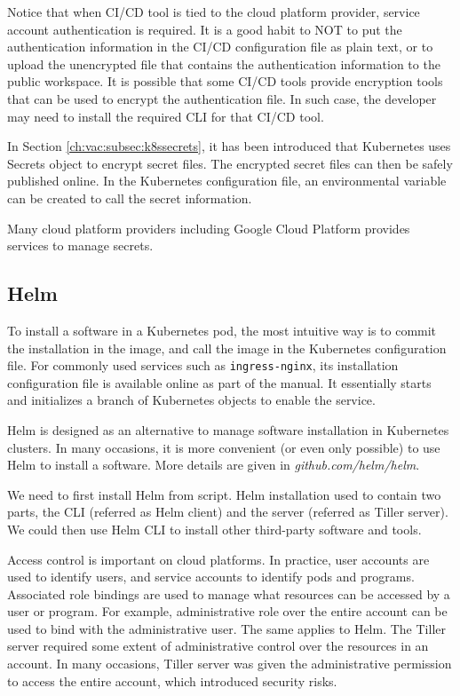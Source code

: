 Notice that when CI/CD tool is tied to the cloud platform provider, service account authentication is required. It is a good habit to NOT to put the authentication information in the CI/CD configuration file as plain text, or to upload the unencrypted file that contains the authentication information to the public workspace. It is possible that some CI/CD tools provide encryption tools that can be used to encrypt the authentication file. In such case, the developer may need to install the required CLI for that CI/CD tool.

In Section \ref{ch:vac:subsec:k8ssecrets}, it has been introduced that Kubernetes uses Secrets object to encrypt secret files. The encrypted secret files can then be safely published online. In the Kubernetes configuration file, an environmental variable can be created to call the secret information.

Many cloud platform providers including Google Cloud Platform provides services to manage secrets.

\subsection{Helm}

To install a software in a Kubernetes pod, the most intuitive way is to commit the installation in the image, and call the image in the Kubernetes configuration file. For commonly used services such as \verb|ingress-nginx|, its installation configuration file is available online as part of the manual. It essentially starts and initializes a branch of Kubernetes objects to enable the service.

Helm is designed as an alternative to manage software installation in Kubernetes clusters. In many occasions, it is more convenient (or even only possible) to use Helm to install a software. More details are given in \textit{github.com/helm/helm}.

We need to first install Helm from script. Helm installation used to contain two parts, the CLI (referred as Helm client) and the server (referred as Tiller server). We could then use Helm CLI to install other third-party software and tools.

Access control is important on cloud platforms. In practice, user accounts are used to identify users, and service accounts to identify pods and programs. Associated role bindings are used to manage what resources can be accessed by a user or program. For example, administrative role over the entire account can be used to bind with the administrative user. The same applies to Helm. The Tiller server required some extent of administrative control over the resources in an account. In many occasions, Tiller server was given the administrative permission to access the entire account, which introduced security risks.

